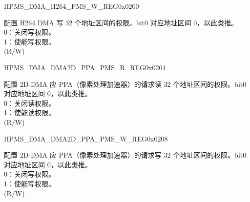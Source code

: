 \begin{register}{H}{PMS\_DMA\_H264\_PMS\_W\_REG}{0x0200}\label{regdesc:PMSDMAH264PMSWREG}
%
\regnewline%
\begin{regdesc}\begin{reglist}
\label{fielddesc:PMSDMAH264WPMS}\item [PMS\_DMA\_H264\_W\_PMS] 配置 H264 DMA 写 32 个地址区间的权限。bit0 对应地址区间 0，以此类推。\\
0：关闭写权限。\\
1：使能写权限。\\ (R/W)
\end{reglist}\end{regdesc}
\end{register}


\begin{register}{H}{PMS\_DMA\_DMA2D\_PPA\_PMS\_R\_REG}{0x0204}\label{regdesc:PMSDMADMA2DPPAPMSRREG}
%
\regnewline%
\begin{regdesc}\begin{reglist}
\label{fielddesc:PMSDMADMA2DPPARPMS}\item [PMS\_DMA\_DMA2D\_PPA\_R\_PMS] 配置 2D-DMA 应 PPA（像素处理加速器）的请求读 32 个地址区间的权限。bit0 对应地址区间 0，以此类推。\\
0：关闭读权限。\\
1：使能读权限。\\ (R/W)
\end{reglist}\end{regdesc}
\end{register}


\begin{register}{H}{PMS\_DMA\_DMA2D\_PPA\_PMS\_W\_REG}{0x0208}\label{regdesc:PMSDMADMA2DPPAPMSWREG}
%
\regnewline%
\begin{regdesc}\begin{reglist}
\label{fielddesc:PMSDMADMA2DPPAWPMS}\item [PMS\_DMA\_DMA2D\_PPA\_W\_PMS] 配置 2D-DMA 应 PPA（像素处理加速器）的请求写 32 个地址区间的权限。bit0 对应地址区间 0，以此类推。\\
0：关闭写权限。\\
1：使能写权限。\\ (R/W)
\end{reglist}\end{regdesc}
\end{register}


